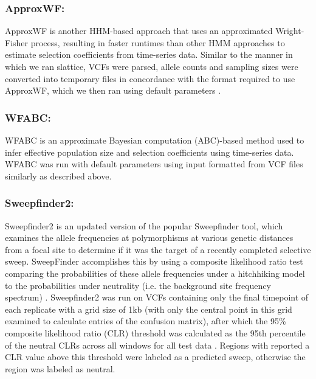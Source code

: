 \subsubsection{ApproxWF: } ApproxWF \cite{ferrer-admetllaApproximateMarkovModel2016} is another HHM-based approach that uses an approximated Wright-Fisher process, resulting in faster runtimes than other HMM approaches to estimate selection coefficients from time-series data. Similar to the manner in which we ran slattice, VCFs were parsed, allele counts and sampling sizes were converted into temporary files in concordance with the format required to use ApproxWF, which we then ran using default parameters .

 \subsubsection{WFABC: } WFABC \cite{follWFABCWrightFisher2015} is an approximate Bayesian computation (ABC)-based method used to infer effective population size and selection coefficients using time-series data. WFABC was run with default parameters using input formatted from VCF files similarly as described above. 

\subsubsection{Sweepfinder2: } Sweepfinder2 \cite{degiorgioSweepFinder2IncreasedSensitivity2016} is an updated version of the popular Sweepfinder \cite{nielsenGenomicScansSelective2005} tool, which examines the allele frequencies at polymorphisms at various genetic distances from a focal site to determine if it was the target of a recently completed selective sweep. SweepFinder accomplishes this by using a composite likelihood ratio test comparing the probabilities of these allele frequencies under a hitchhiking model to the probabilities under neutrality (i.e. the background site frequency spectrum) . Sweepfinder2 was run on VCFs containing only the final timepoint of each replicate with a grid size of 1kb (with only the central point in this grid examined to calculate entries of the confusion matrix), after which the 95\% composite likelihood ratio (CLR) threshold was calculated as the 95th percentile of the neutral CLRs across all windows for all test data . Regions with reported a CLR value above this threshold were labeled as a predicted sweep, otherwise the region was labeled as neutral.

